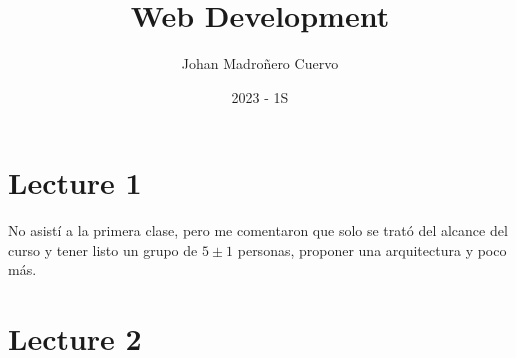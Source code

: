 \documentclass{article}
\author{Johan Madroñero Cuervo}
\title{Web Development}
\date{2023 - 1S}
\theoremstyle{definition}
\begin{document}
\maketitle
\thispagestyle{empty}
\newpage
\tableofcontents
\thispagestyle{empty}
\newpage

\section{Lecture 1}

No asistí a la primera clase, pero me comentaron que solo
se trató del alcance del curso y tener listo un grupo de 
$ 5 \pm 1$ personas, proponer una arquitectura y poco más.

\section{Lecture 2}
\end{document}
